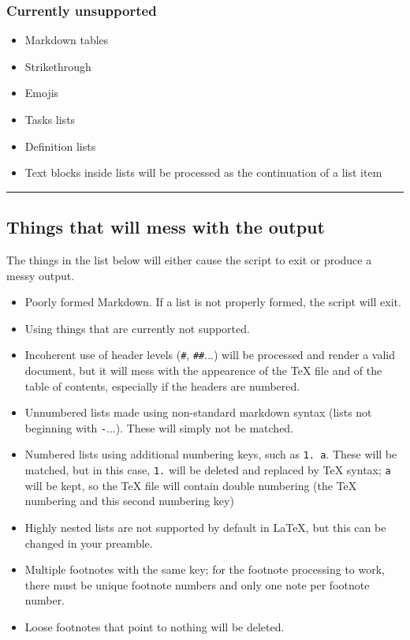 \documentclass[a4paper, 12pt, twoside]{article}
\begin{document}
\subsubsection{Currently unsupported}

\begin{itemize}
\item Markdown tables
\item Strikethrough
\item Emojis
\item Tasks lists
\item Definition lists
\item Text blocks inside lists will be processed as the continuation of a list item 
\end{itemize}

\par\noindent\rule{\linewidth}{0.4pt}
\subsection{Things that will mess with the output}

The things in the list below will either cause the script to exit or produce a messy output.

\begin{itemize}
\item Poorly formed Markdown. If a list is not properly formed, the script will exit.
\item Using things that are currently not supported.
\item Incoherent use of header levels (\texttt{\#}, \texttt{\#\#}...) will be processed and render a valid document, but it will mess with the appearence of the TeX file and of the table of contents, especially if the headers are numbered.
\item Unnumbered lists made using non-standard markdown syntax (lists not beginning with \texttt{-}...). These will simply not be matched.
\item Numbered lists using additional numbering keys, such as \texttt{1. a}. These will be matched, but in this case, \texttt{1.} will be deleted and replaced by TeX syntax; \texttt{a} will be kept, so the TeX file will contain double numbering (the TeX numbering and this second numbering key)
\item Highly nested lists are not supported by default in LaTeX, but this can be changed in your preamble.
\item Multiple footnotes with the same key; for the footnote processing to work, there must be unique footnote numbers and only one note per footnote number.
\item Loose footnotes that point to nothing will be deleted. 
\end{itemize}
\end{document}
